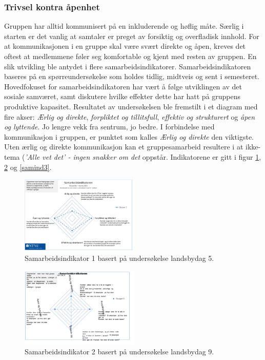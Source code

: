 \subsubsection{Trivsel kontra åpenhet}

Gruppen har alltid kommunisert på en inkluderende og høflig måte. 
Særlig i starten er det vanlig at samtaler er preget av forsiktig og overfladisk innhold. 
For at kommunikasjonen i en gruppe skal være svært direkte og åpen, kreves det oftest at medlemmene føler seg komfortable og kjent med resten av gruppen. 
En slik utvikling ble antydet i flere samarbeidsindikatorer. 
Samarbeidsindikatoren baseres på en spørreundersøkelse som holdes tidlig, midtveis og sent i semesteret.\\

Hovedfokuset for samarbeidsindikatoren har vært å følge utviklingen av det sosiale samværet, samt diskutere hvilke effekter dette har hatt på gruppens produktive kapasitet.
Resultatet av undersøkelsen ble fremstilt i et diagram med fire akser: \textit{Ærlig og direkte}, \textit{forpliktet og tillitsfull}, \textit{effektiv og strukturert} og \textit{åpen og lyttende}.
Jo lengre vekk fra sentrum, jo bedre.
I forbindelse med kommunikasjon i gruppen, er punktet som kalles \textit{Ærlig og direkte} den viktigste. 
Uten ærlig og direkte kommunikasjon kan et gruppesamarbeid resultere i at ikke-tema (\textit{'Alle vet det' - ingen snakker om det} oppstår.
Indikatorene er gitt i figur \ref{samind1}, \ref{samind2} og \ref{samind3}.

\begin{figure}[h!]

  \centering
    \includegraphics[width=0.5\textwidth]{Bilder/samarbeidsindikator1.png}
  \caption{Samarbeidsindikator 1 basert på undersøkelse landsbydag 5.}
    \label{samind1}
\end{figure}

\begin{figure}[h!]
 
  \centering
    \includegraphics[width=0.5\textwidth]{Bilder/samarbeidsindikator_2.png}
 \caption{Samarbeidsindikator 2 basert på undersøkelse landsbydag 9.}
    \label{samind2}
\end{figure}

